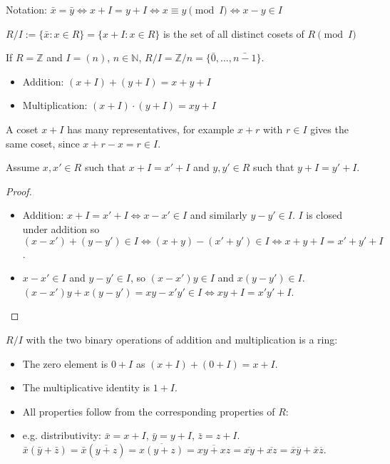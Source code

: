 Notation: $\bar{x} = \bar{y} \Leftrightarrow x + I = y + I \Leftrightarrow x \equiv y \pmod I \Leftrightarrow x - y \in I$

\begin{definition}
	$R / I := \{\bar{x}: x \in R \} = \{x + I: x \in R\}$ is the set of all distinct cosets of $R \pmod I$ 
\end{definition}

\begin{remark}
	If $R = \mathbb{Z}$ and $I = (n)$, $n \in \mathbb{N}$, $R / I = \mathbb{Z} / n = \{\bar{0}, \dots, \bar{n - 1}\}$.
\end{remark}

\begin{definition}
	\hfill
	\begin{itemize}
		\item Addition: $(x + I) + (y + I) = x + y + I$
		\item Multiplication: $(x + I) \cdot (y + I) = xy + I$
	\end{itemize}
\end{definition}

A coset $x + I$ has many representatives, for example $x + r$ with $r \in I$ gives the same coset, since $x + r - x = r \in I$.

Assume $x, x' \in R$ such that $x + I = x' + I$ and $y, y' \in R$ such that $y + I = y' + I$.

\begin{proof}
	\begin{itemize}
		\item Addition: $x + I = x' + I \Leftrightarrow x - x' \in I$ and similarly $y - y' \in I$. $I$ is closed under addition so $(x - x') + (y - y') \in I \Leftrightarrow (x + y) - (x' + y') \in I \Leftrightarrow x + y + I = x' + y' + I$.
		\item $x - x' \in I$ and $y - y' \in I$, so $(x - x')y \in I$ and $x(y - y') \in I$. $(x - x')y + x(y - y') = xy - x'y' \in I \Leftrightarrow xy + I = x'y' + I$.
	\end{itemize}
\end{proof}

$R / I$ with the two binary operations of addition and multiplication is a ring:
\begin{itemize}
	\item The zero element is $0 + I$ as $(x + I) + (0 + I) = x + I$.
	\item The multiplicative identity is $1 + I$.
	\item All properties follow from the corresponding properties of $R$:
	\item e.g. distributivity: $\bar{x} = x + I$, $\bar{y} = y + I$, $\bar{z} = z + I$.
	$\bar{x}(\bar{y} + \bar{z}) = \bar{x}(\overline{y + z}) = \overline{x(y + z)} = \overline{xy + xz} = \overline{xy} + \overline{xz} = \overline{x}\overline{y} + \overline{x}\overline{z}$.
\end{itemize}

